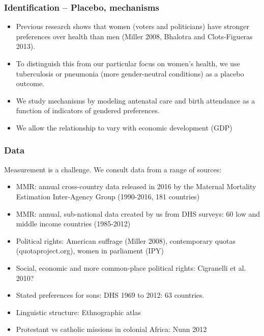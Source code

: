 \documentclass[9pt,letterpaper,subeqn]{beamer}
\begin{document}
\begin{frame}
  \frametitle{Identification -- Placebo, mechanisms}
   \begin{itemize}
  \item Previous research shows that women (voters and politicians) have stronger preferences over health than men (Miller 2008, Bhalotra and Clots-Figueras 2013).
	\item To distinguish this from our particular focus on women's health, we use tuberculosis or pneumonia (more gender-neutral conditions) as a placebo outcome.
	\item We study mechanisms by modeling antenatal care and birth attendance as a function of indicators of gendered preferences.
	\item We allow the relationship to vary with economic development (GDP)
\end{itemize}
\end{frame}

\begin{frame}
  \frametitle{Data}
  Measurement is a challenge. We consult data from a range of sources:
  \begin{itemize}
    \item MMR: annual cross-country data released in 2016 by the Maternal Mortality Estimation Inter-Agency Group (1990-2016, 181 countries)
    \item MMR: annual, sub-national data created by us from DHS surveys: 60 low and middle income countries (1985-2012)
    \item Political rights: American suffrage (Miller 2008), contemporary quotas (quotaproject.org), women in parliament (IPY)
    \item Social, economic and more common-place political rights: Cigranelli et al. 2010?
    \item Stated preferences for sons: DHS 1969 to 2012: 63 countries.
    \item Linguistic structure: Ethnographic atlas %
    \item Protestant vs catholic missions in colonial Africa: Nunn 2012
  \end{itemize}  
\end{frame}
\end{document}
